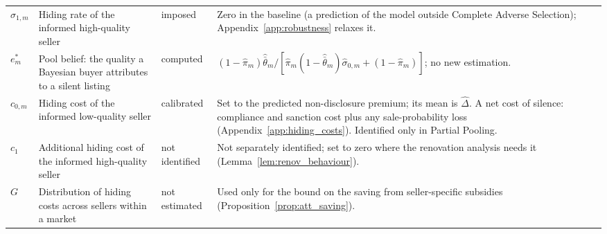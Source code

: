 \begin{table}[htbp]
\begin{tabular}{@{}llll@{}}
\parbox[t]{.09\textwidth}{\raggedright $\sigma_{1,m}$} & \parbox[t]{.30\textwidth}{\raggedright Hiding rate of the informed high-quality seller} & \parbox[t]{.14\textwidth}{\raggedright imposed} & \parbox[t]{.37\textwidth}{\raggedright Zero in the baseline (a prediction of the model outside Complete Adverse Selection); Appendix~\ref{app:robustness} relaxes it.} \\[12pt]
\parbox[t]{.09\textwidth}{\raggedright $e^*_m$} & \parbox[t]{.30\textwidth}{\raggedright Pool belief: the quality a Bayesian buyer attributes to a silent listing} & \parbox[t]{.14\textwidth}{\raggedright computed} & \parbox[t]{.37\textwidth}{\raggedright $(1-\hat\pi_m)\hat{\bar\theta}_m/[\hat\pi_m(1-\hat{\bar\theta}_m)\hat\sigma_{0,m}+(1-\hat\pi_m)]$; no new estimation.} \\[12pt]
\parbox[t]{.09\textwidth}{\raggedright $c_{0,m}$} & \parbox[t]{.30\textwidth}{\raggedright Hiding cost of the informed low-quality seller} & \parbox[t]{.14\textwidth}{\raggedright calibrated} & \parbox[t]{.37\textwidth}{\raggedright Set to the predicted non-disclosure premium; its mean is $\hat\Delta$. A net cost of silence: compliance and sanction cost plus any sale-probability loss (Appendix~\ref{app:hiding_costs}). Identified only in Partial Pooling.} \\[12pt]
\parbox[t]{.09\textwidth}{\raggedright $c_{1}$} & \parbox[t]{.30\textwidth}{\raggedright Additional hiding cost of the informed high-quality seller} & \parbox[t]{.14\textwidth}{\raggedright not identified} & \parbox[t]{.37\textwidth}{\raggedright Not separately identified; set to zero where the renovation analysis needs it (Lemma~\ref{lem:renov_behaviour}).} \\[12pt]
\parbox[t]{.09\textwidth}{\raggedright $G$} & \parbox[t]{.30\textwidth}{\raggedright Distribution of hiding costs across sellers within a market} & \parbox[t]{.14\textwidth}{\raggedright not estimated} & \parbox[t]{.37\textwidth}{\raggedright Used only for the bound on the saving from seller-specific subsidies (Proposition~\ref{prop:att_saving}).} \\[12pt]
\bottomrule
\end{tabular}
\end{table}


